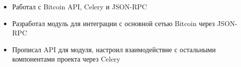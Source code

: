 \begin{itemize}
    \item Работал с Bitcoin API, Celery и JSON-RPC
    \item Разработал модуль для интеграции с основной сетью Bitcoin через JSON-RPC 
    \item Прописал API для модуля, настроил взаимодействие с остальными компонентами проекта через Celery
\end{itemize}
